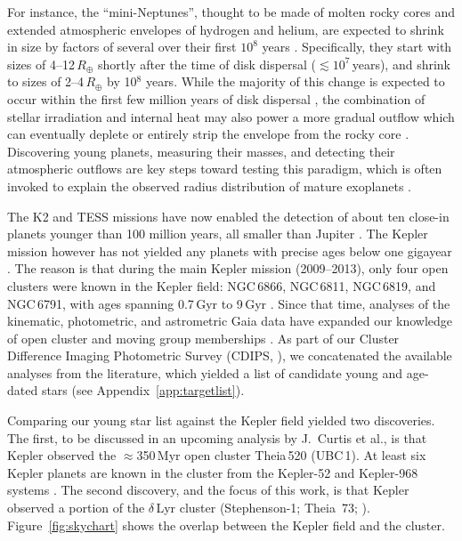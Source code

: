 \documentclass[12pt,modern,twocolumn,tighten]{aastex63}
\begin{document}
For instance, the ``mini-Neptunes'', thought to be made of molten
rocky cores \citep{kite_atmosphere_2020} and extended atmospheric
envelopes of hydrogen and helium, are expected to shrink in size by
factors of several over their first $10^8$ years
\citep{owen_atmospheres_2016,owen_constraining_2020}.  Specifically,
they start with sizes of 4--12\,$R_\oplus$ shortly after the time of disk
dispersal ($\lesssim$$10^7$\,years), and shrink to sizes of
2--4\,$R_\oplus$ by 10$^8$ years.  While the majority of this change
is expected to occur within the first few million years of disk
dispersal \citep{owen_atmospheres_2016}, the combination of stellar
irradiation and internal heat may also power a more
gradual outflow which can eventually deplete or entirely strip the
envelope from the rocky core
\citep{Owen_Wu_2013,ginzburg_corepowered_2018}.  Discovering young
planets, measuring their masses, and detecting their atmospheric
outflows are key steps toward testing this paradigm, which is often
invoked to explain the observed radius distribution of mature
exoplanets \citep{Fulton_et_al_2017}.

The K2 and TESS missions have now enabled the detection of about ten
close-in planets younger than 100 million years, all smaller than
Jupiter
\citep{Mann_K2_33b_2016,David_et_al_2017,david_four_2019,newton_tess_2019,bouma_cluster_2020,plavchan_planet_2020,rizzuto_tess_2020}.
The Kepler mission however has not yielded any planets with precise
ages below one gigayear \citep{Meibom_et_al_2013}.  The reason is that
during the main Kepler mission (2009--2013), only four open
clusters were known in the Kepler field: NGC\,6866, NGC\,6811,
NGC\,6819, and NGC\,6791, with ages spanning 0.7\,Gyr to 9\,Gyr
\citep{meibom_kepler_2011}.  Since that time, analyses of the
kinematic, photometric, and astrometric Gaia data have expanded our
knowledge of open cluster and moving group memberships \citep[{\it
e.g.},][]{cantatgaudin_gaia_2018,zari_3d_2018,kounkel_untangling_2019,Meingast2021,Kerr2021}.
As part of our Cluster Difference Imaging Photometric Survey (CDIPS,
\citealt{bouma_cdipsI_2019}), we concatenated the available analyses
from the literature, which yielded a list of candidate young and
age-dated stars (see Appendix~\ref{app:targetlist}).

Comparing our young star list against the Kepler field yielded two
discoveries.  The first, to be discussed in an upcoming analysis by
J.~Curtis et al{.}, is that Kepler observed the $\approx$350\,Myr open
cluster Theia\,520 (UBC\,1).  At least six Kepler planets are known in
the cluster from the Kepler-52 and Kepler-968 systems
\citep{rowe_validation_2014,jontof-hutter_following_2021}.  The second
discovery, and the focus of this work, is that Kepler observed a
portion of the $\delta$\,Lyr cluster (Stephenson-1; Theia~73;
\citealt{stephenson_possible_1959}).  Figure~\ref{fig:skychart} shows
the overlap between the Kepler field and the cluster.
\end{document}
